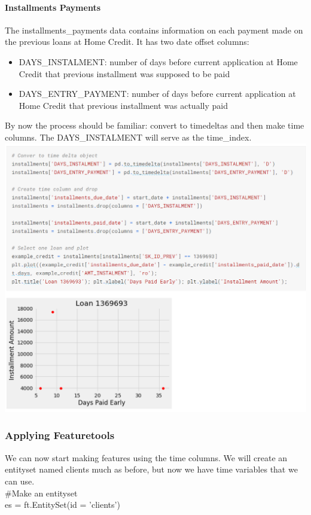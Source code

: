 \documentclass[twoside,a4paper]{article}
\begin{document}
\paragraph{Installments Payments}
The installments\_payments data contains information on each payment made on the previous loans at Home Credit. It has two date offset columns:
\begin{itemize}
 \item DAYS\_INSTALMENT: number of days before current application at Home Credit that previous installment was supposed to be paid
 \item DAYS\_ENTRY\_PAYMENT: number of days before current application at Home Credit that previous installment was actually paid
\end{itemize}
By now the process should be familiar: convert to timedeltas and then make time columns. The DAYS\_INSTALMENT will serve as the time\_index.\\
\includegraphics[scale=.8]{15.png}
\subsubsection{Applying Featuretools}
We can now start making features using the time columns. We will create an entityset named clients much as before, but now we have time variables that we can use.\\
\#Make an entityset\\
es = ft.EntitySet(id = 'clients')\\
\end{document}
